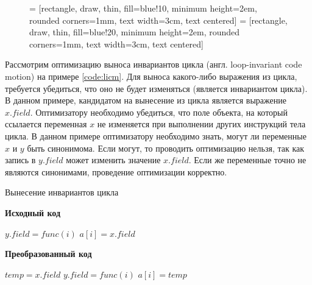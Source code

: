 \documentclass[14pt,titlepage]{extarticle}
\newcommand{\algorithmictitle}[1]{\hspace{8mm}\textbf{#1}}
\newcommand{\eng}[1]{{\English#1}}
\begin{document}
      \begin{figure}[!htb]
        \centering

         = [rectangle, draw, thin, fill=blue!10,
                            minimum height=2em, rounded corners=1mm,
                            text width=3cm, text centered]
         =  [rectangle, draw, thin, fill=blue!20,
                            minimum height=2em, rounded corners=1mm,
                            text width=3cm, text centered]

      \end{figure}

      Рассмотрим оптимизацию выноса инвариантов цикла (англ.
      \eng{loop-invariant code motion}) на примере \ref{code:licm}.
      Для выноса какого-либо выражения из цикла, требуется убедиться, что оно
      не будет изменяться (является инвариантом цикла).
      В данном примере, кандидатом на вынесение из цикла является выражение
      $x.field$. Оптимизатору необходимо убедиться, что поле объекта, на
      который ссылается переменная $x$ не изменяется при выполнении других
      инструкций тела цикла. В данном примере оптимизатору необходимо знать,
      могут ли переменные $x$ и $y$ быть синонимома. Если могут, то
      проводить оптимизацию нельзя, так как запись в $y.field$ может изменить
      значение $x.field$. Если же переменные точно не являются синонимами,
      проведение оптимизации корректно.

      \begin{algorithm}
        \caption{Вынесение инвариантов цикла}
        \label{code:licm}
        \begin{multicols*}{2}
          \algorithmictitle{Исходный код}
          \begin{algorithmic}[1]
            \STATE $y.field = func(i)$
            \STATE $a[i] = x.field$
            \ENDFOR
          \end{algorithmic}
          \columnbreak
          \algorithmictitle{Преобразованный код}
          \begin{algorithmic}[1]
            \STATE $temp = x.field$
            \STATE $y.field = func(i)$
            \STATE $a[i] = temp$
            \ENDFOR
          \end{algorithmic}
        \end{multicols*}
      \end{algorithm}
\end{document}
